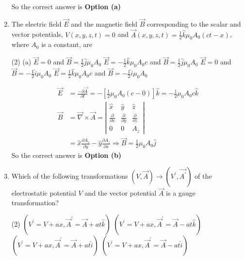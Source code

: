 \begin{enumerate}
\begin{answer}
	So the correct answer is \textbf{Option (a)}
\end{answer}
	\item   The electric field $\vec{E}$ and the magnetic field $\vec{B}$ corresponding to the scalar and vector potentials, $V(x, y, z, t)=0$ and $\vec{A}(x, y, z, t)=\frac{1}{2} \hat{k} \mu_{0} A_{0}(c t-x)$, where $A_{0}$ is a constant, are 
	{}
	\begin{tasks}(2)
		\task[\textbf{a.}] (a) $\vec{E}=0$ and $\vec{B}=\frac{1}{2} \hat{j} \mu_{0} A_{0}$
		\task[\textbf{b.}] $\vec{E}=-\frac{1}{2} \hat{k} \mu_{0} A_{0} c$ and $\vec{B}=\frac{1}{2} \hat{j} \mu_{0} A_{0}$
		\task[\textbf{c.}]  $\vec{E}=0$ and $\vec{B}=-\frac{1}{2} \hat{i} \mu_{0} A_{0}$
		\task[\textbf{d.}] $\vec{E}=\frac{1}{2} \hat{k} \mu_{0} A_{0} c$ and $\vec{B}=-\frac{1}{2} \hat{i} \mu_{0} A_{0}$
	\end{tasks}
\begin{answer}
	\begin{align*}
	\vec{E}&=\frac{-\partial \vec{A}}{\partial t}=-\left[\frac{1}{2} \mu_{0} A_{0}(c-0)\right] \hat{k}=-\frac{1}{2} \mu_{0} A_{0} c \hat{k}\\
	\vec{B}&=\vec{\nabla} \times \vec{A}=\left|\begin{array}{ccc}\hat{x} & \hat{y} & \hat{z} \\ \frac{\partial}{\partial x} & \frac{\partial}{\partial y} & \frac{\partial}{\partial z} \\ 0 & 0 & A_{z}\end{array}\right|\\&=\hat{x} \frac{\partial A_{z}}{\partial y}-\hat{y} \frac{\partial A_{z}}{\partial x} \Rightarrow \vec{B}=\frac{1}{2} \mu_{0} A_{0} \hat{j}
	\end{align*}
	So the correct answer is \textbf{Option (b)}
\end{answer}
	\item  Which of the following transformations $(V, \vec{A}) \rightarrow\left(V^{\prime}, \overrightarrow{A^{\prime}}\right)$ of the electrostatic potential $V$ and the vector potential $\vec{A}$ is a gauge transformation?
	{}
	\begin{tasks}(2)
		\task[\textbf{a.}]$\left(V^{\prime}=V+a x, \vec{A}^{\prime}=\vec{A}+a t \hat{k}\right)$
		\task[\textbf{b.}]$\left(V^{\prime}=V+a x, \vec{A}^{\prime}=\vec{A}-a t \hat{k}\right)$
		\task[\textbf{c.}]$\left(V^{\prime}=V+a x, \vec{A}^{\prime}=\vec{A}+a t \hat{i}\right)$
		\task[\textbf{d.}] $\left(V^{\prime}=V+a x, \vec{A}^{\prime}=\vec{A}-a t \hat{i}\right)$

\end{tasks}
\end{enumerate}
